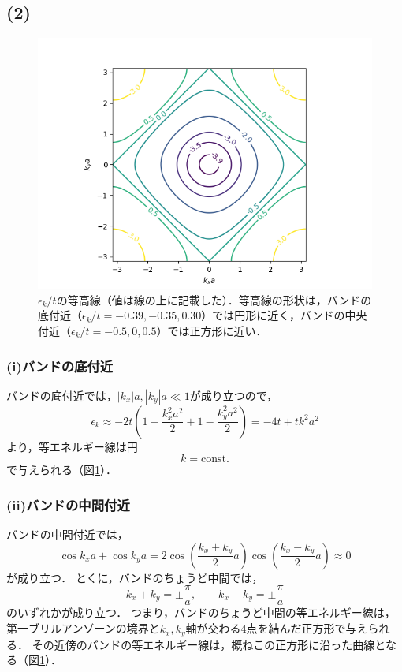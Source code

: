 \documentclass[a4paper,11pt]{jsarticle}
\begin{document}
\subsection*{(2)}

\begin{figure}[htbp]
  \centering
  \includegraphics[width=13cm]{2DHM.png}
  \caption{$\epsilon_k/t$の等高線（値は線の上に記載した）．等高線の形状は，バンドの底付近（$\epsilon_k/t = -0.39,-0.35,0.30$）では円形に近く，バンドの中央付近（$\epsilon_k/t=-0.5,0,0.5$）では正方形に近い．}
  \label{fig:2DHM}
\end{figure}

\subsubsection*{(i)バンドの底付近}
バンドの底付近では，$|k_x|a, |k_y|a \ll 1$が成り立つので，
\begin{equation}
  \epsilon_k \approx -2t(1-\frac{k_x^2a^2}{2}+1-\frac{k_y^2a^2}{2}) = -4t + tk^2a^2 
\end{equation}
より，等エネルギー線は円
\begin{equation}
  k = \mathrm{const.}
\end{equation}
で与えられる（図\ref{fig:2DHM}）．

\subsubsection*{(ii)バンドの中間付近}
バンドの中間付近では，
\begin{equation}
  \cos{k_xa}+\cos{k_ya} = 2\cos{\left(\frac{k_x + k_y}{2}a\right)}\cos{\left(\frac{k_x - k_y}{2}a\right)} \approx 0
\end{equation}
が成り立つ．
とくに，バンドのちょうど中間では，
\begin{equation}
  k_x + k_y = \pm\frac{\pi}{a}, \qquad k_x - k_y = \pm\frac{\pi}{a}
\end{equation}
のいずれかが成り立つ．
つまり，バンドのちょうど中間の等エネルギー線は，第一ブリルアンゾーンの境界と$k_x,k_y$軸が交わる4点を結んだ正方形で与えられる．
その近傍のバンドの等エネルギー線は，概ねこの正方形に沿った曲線となる（図\ref{fig:2DHM}）．
\end{document}
